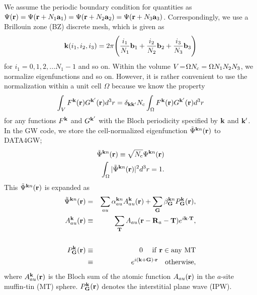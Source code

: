 \documentclass[a4paper,10pt,epsf,fleqn]{article}
\begin{document}
We assume the periodic boundary condition for
quantities as $\Psi({\bf r}) = \Psi({\bf r}+ N_1 {\bf a}_1)
= \Psi({\bf r}+ N_2 {\bf a}_2)= \Psi({\bf r}+ N_3 {\bf a}_3)$.
Correspondingly, we use a Brillouin zone (BZ) discrete mesh, 
which is given as
\begin{eqnarray}
{\bf k}(i_1,i_2,i_3)= 2 \pi \Biggr( \frac{i_1}{N_1} {\bf b}_1 
+ \frac{i_2}{N_2} {\bf b}_2 + \frac{i_3}{N_3} {\bf b}_3 \Biggr)
\label{kmesh}
\end{eqnarray}
for $i_1=\!0,\!1,\!2,...N_1\!-\!1$ and so on.
Within the volume $V\!=\!\Omega N_{\rm c}=\Omega N_1N_2N_3$, 
we normalize eigenfunctions 
and so on. However, it is rather convenient to use 
the normalization within a unit cell $\Omega$ because we know
the property
\begin{eqnarray}
  \int_V F^{\bf k} ({\bf r}) G^{\bf k'} ({\bf r}) d^3r = \delta_{\bf k k'} 
  N_{\rm c} \int_\Omega F^{\bf k} ({\bf r}) G^{\bf k'} ({\bf r}) d^3r
\end{eqnarray}
for any functions $F^{\bf k}$ and $G^{\bf k'}$ 
with the Bloch periodicity specified by ${\bf k}$ and ${\bf k'}$.
In the GW code, we store the cell-normalized eigenfunction 
$\tilde{\Psi}^{{\bf k}n}({\bf r})$ to {\sf DATA4GW};
\begin{eqnarray}
  \tilde{\Psi}^{{\bf k}n}({\bf r}) 
  \equiv %
  \sqrt{N_{\rm c}}\Psi^{{\bf k}n}({\bf r}) \\
  \int_\Omega |\tilde{\Psi}^{{\bf k}n}({\bf r})|^2 d^3r =1.
\end{eqnarray}
This $\tilde{\Psi}^{{\bf k}n}({\bf r})$ is expanded as
\begin{eqnarray}
\hspace{-3cm}\tilde{\Psi}^{{\bf k}n}({\bf r}) 
&=& \sum_{a u} \alpha^{{\bf k} n}_{au} A^{\bf k}_{a u}({\bf r})
 + \sum_{\bf G} \beta^{{\bf k}n}_{\bf G} P^{\bf k}_{\bf G}({\bf r}), \\
A^{\bf k}_{a u}({\bf r}) &\equiv& 
          \sum_{\bf T} A_{a u}({\bf r-R}_a-{\bf T})e^{i{\bf k\cdot T}}, \\
\nonumber \\
P^{\bf k}_{\bf G}({\bf r}) &\equiv& 0  \ \ \ {\rm \ if \ {\bf r} \in any \ MT} 
\nonumber \\
        &\equiv& e^{i({\bf k+G})\cdot{\bf r}} \ \ \ {\rm otherwise},
\end{eqnarray}
where $A^{\bf k}_{a u}({\bf r})$ is the Bloch sum of
the atomic function $A_{au}({\bf r})$ in the $a$-site muffin-tin (MT) sphere.
$P^{\bf k}_{\bf G}({\bf r})$ denotes the interstitial plane wave (IPW).
\end{document}
